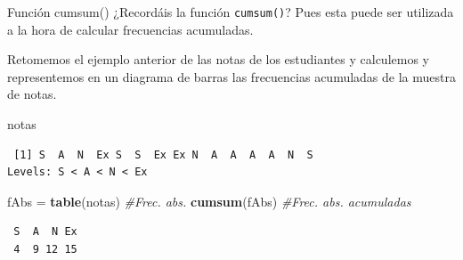 \documentclass[
  ignorenonframetext,
]{beamer}
\newenvironment{Shaded}{\begin{snugshade}}{\end{snugshade}}
\newcommand{\CommentTok}[1]{\textcolor[rgb]{0.56,0.35,0.01}{\textit{#1}}}
\newcommand{\FunctionTok}[1]{\textcolor[rgb]{0.13,0.29,0.53}{\textbf{#1}}}
\newcommand{\NormalTok}[1]{#1}
\newcommand{\OtherTok}[1]{\textcolor[rgb]{0.56,0.35,0.01}{#1}}
\begin{document}
\begin{frame}[fragile]{Función cumsum()}
\label{funciuxf3n-cumsum-6}
¿Recordáis la función \texttt{cumsum()}? Pues esta puede ser utilizada a
la hora de calcular frecuencias acumuladas.

Retomemos el ejemplo anterior de las notas de los estudiantes y
calculemos y representemos en un diagrama de barras las frecuencias
acumuladas de la muestra de notas.

\begin{Shaded}
\begin{Highlighting}[]
\NormalTok{notas}
\end{Highlighting}
\end{Shaded}

\begin{verbatim}
 [1] S  A  N  Ex S  S  Ex Ex N  A  A  A  A  N  S 
Levels: S < A < N < Ex
\end{verbatim}

\begin{Shaded}
\begin{Highlighting}[]
\NormalTok{fAbs }\OtherTok{=} \FunctionTok{table}\NormalTok{(notas) }\CommentTok{\#Frec. abs.}
\FunctionTok{cumsum}\NormalTok{(fAbs) }\CommentTok{\#Frec. abs. acumuladas}
\end{Highlighting}
\end{Shaded}

\begin{verbatim}
 S  A  N Ex 
 4  9 12 15 
\end{verbatim}
\end{frame}
\end{document}
